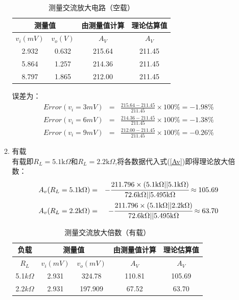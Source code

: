 \documentclass[a4paper]{article}
\begin{document}
\begin{enumerate}
\begin{enumerate}
\begin{table}[!h]
\centering
\caption{测量交流放大电路（空载）}
\label{Av_NL}
\begin{tabular}{c|c|c|c}
\hline
\multicolumn{2}{c|}{测量值} & 由测量值计算 & 理论估算值 \\ \hline
$v_i(mV)$   & $v_o(V)$  & $A_V$  & $A_V$ \\ \hline
2.932                 & 0.632         & 215.64    & 211.45      \\ \hline
5.864                 & 1.257         & 214.36    & 211.45      \\ \hline
8.797                 & 1.865         & 212.00    & 211.45      \\ \hline
\end{tabular}
\end{table}

误差为：
\begin{eqnarray}
Error(v_i=3mV) &=& \frac{215.64-211.45}{211.45}\times 100\% = -1.98\%\\
Error(v_i=6mV) &=& \frac{214.36-211.45}{211.45}\times 100\% = -1.38\%\\
Error(v_i=9mV) &=& \frac{212.00-211.45}{211.45}\times 100\% = -0.26\%
\end{eqnarray}
\item 有载\\
有载即$R_L = 5.1\text{k}\Omega$和$R_L = 2.2\text{k}\Omega$,将各数据代入式(\ref{Av})即得理论放大倍数：
\begin{eqnarray}
A_v(R_L = 5.1\text{k}\Omega) &=& -\cfrac{211.796\times(5.1\text{k}\Omega || 5.1\text{k}\Omega)}{72.6\text{k}\Omega || 5.495\text{k}\Omega} \approx 105.69\\
A_v(R_L = 2.2\text{k}\Omega) &=& -\cfrac{211.796\times(5.1\text{k}\Omega || 2.2\text{k}\Omega)}{72.6\text{k}\Omega || 5.495\text{k}\Omega} \approx 63.70
\end{eqnarray}
\begin{table}[!h]
\centering
\caption{测量交流放大倍数（有载）}
\label{Av_L}
\begin{tabular}{c|c|c|c|c}
\hline
负载           & \multicolumn{2}{c|}{测量值}                 & 由测量值计算 & 理论估算值 \\ \hline
$R_L$        & $v_i(mV)$ & $v_o(mV)$ & $A_V$  & $A_V$ \\ \hline
5.1$k\Omega$ & 2.931 & 324.78        & 110.81 & 105.69      \\ \hline
2.2$k\Omega$ & 2.931 & 197.909       & 67.52  & 63.70    \\ \hline
\end{tabular}
\end{table}


\end{enumerate}
\end{enumerate}
\end{document}
